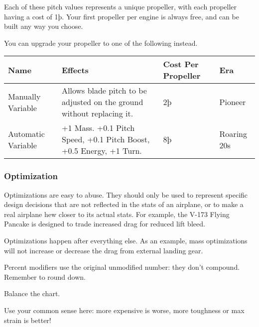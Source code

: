 \documentclass{article}
\begin{document}
Each of these pitch values represents a unique propeller, with
each propeller having a cost of 1þ. Your first propeller per engine is
always free, and can be built any way you choose.

You can upgrade your propeller to one of the following instead.

\begin{tabular}{|l|l|l|l|}
  \hline
  Name                  & Effects                                           & Cost Per Propeller & Era \\\hline
  Manually Variable     & Allows blade pitch to be adjusted on the ground
  without replacing it. & 2þ                                                & Pioneer                  \\\hline
  Automatic Variable    & +1 Mass. +0.1 Pitch Speed, +0.1 Pitch Boost, +0.5
  Energy, +1 Turn.      & 8þ                                                & Roaring 20s              \\\hline
\end{tabular}

\subsubsection{Optimization}
\label{_Optimization}

Optimizations are easy to abuse. They should only be used to represent
specific design decisions that are not reflected in the stats of an
airplane, or to make a real airplane hew closer to its actual stats. For
example, the V-173 Flying Pancake is designed to trade increased drag
for reduced lift bleed.

Optimizations happen after everything else. As an example, mass
optimizations will not increase or decrease the drag from external
landing gear.

Percent modifiers use the original unmodified number: they don't
compound. Remember to round down.

Balance the chart.

Use your common sense here: more expensive is worse, more toughness or
max strain is better!
\end{document}
